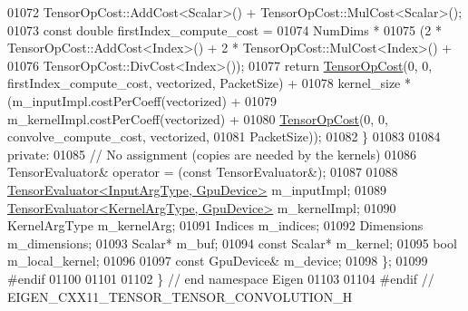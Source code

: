 \begin{DoxyCode}
01072         TensorOpCost::AddCost<Scalar>() + TensorOpCost::MulCost<Scalar>();
01073     \textcolor{keyword}{const} \textcolor{keywordtype}{double} firstIndex\_compute\_cost =
01074         NumDims *
01075         (2 * TensorOpCost::AddCost<Index>() + 2 * TensorOpCost::MulCost<Index>() +
01076          TensorOpCost::DivCost<Index>());
01077     \textcolor{keywordflow}{return} \hyperlink{class_eigen_1_1_tensor_op_cost}{TensorOpCost}(0, 0, firstIndex\_compute\_cost, vectorized, PacketSize) +
01078            kernel\_size * (m\_inputImpl.costPerCoeff(vectorized) +
01079                           m\_kernelImpl.costPerCoeff(vectorized) +
01080                           \hyperlink{class_eigen_1_1_tensor_op_cost}{TensorOpCost}(0, 0, convolve\_compute\_cost, vectorized,
01081                                        PacketSize));
01082   \}
01083 
01084  \textcolor{keyword}{private}:
01085   \textcolor{comment}{// No assignment (copies are needed by the kernels)}
01086   TensorEvaluator& operator = (\textcolor{keyword}{const} TensorEvaluator&);
01087 
01088   \hyperlink{struct_eigen_1_1_tensor_evaluator}{TensorEvaluator<InputArgType, GpuDevice>} m\_inputImpl;
01089   \hyperlink{struct_eigen_1_1_tensor_evaluator}{TensorEvaluator<KernelArgType, GpuDevice>} m\_kernelImpl;
01090   KernelArgType m\_kernelArg;
01091   Indices m\_indices;
01092   Dimensions m\_dimensions;
01093   Scalar* m\_buf;
01094   \textcolor{keyword}{const} Scalar* m\_kernel;
01095   \textcolor{keywordtype}{bool} m\_local\_kernel;
01096 
01097   \textcolor{keyword}{const} GpuDevice& m\_device;
01098 \};
01099 \textcolor{preprocessor}{#endif}
01100 
01101 
01102 \} \textcolor{comment}{// end namespace Eigen}
01103 
01104 \textcolor{preprocessor}{#endif // EIGEN\_CXX11\_TENSOR\_TENSOR\_CONVOLUTION\_H}
\end{DoxyCode}
